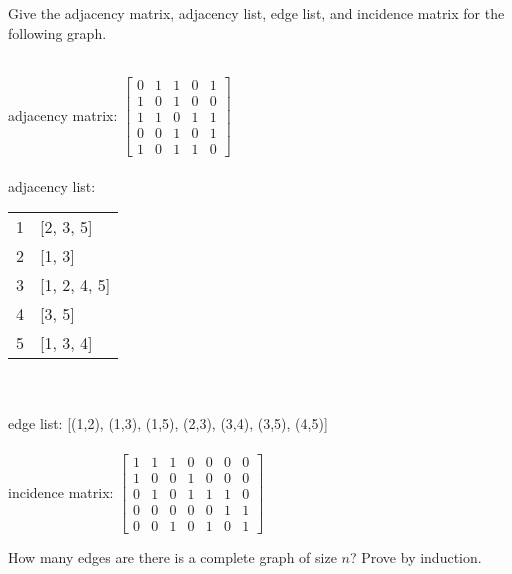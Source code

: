 \documentclass[solutionorbox,answers]{exam}
\begin{document}
\begin{questions}
\question 
Give the adjacency matrix, adjacency list, edge list, and incidence matrix for the following graph. \\
\begin{minipage}{0.3\linewidth}
\end{minipage}
\qquad
\begin{minipage}{0.6\linewidth}
\begin{solutionbox}{3.8in}\\
  adjacency matrix:
  $\begin{bmatrix}
  0 & 1 & 1 & 0 & 1 \\
  1 & 0 & 1 & 0 & 0 \\
  1 & 1 & 0 & 1 & 1 \\
  0 & 0 & 1 & 0 & 1 \\
  1 & 0 & 1 & 1 & 0
  \end{bmatrix}$\\
  \\
  adjacency list:
  \begin{tabular}{ c|l }  
    1&[2, 3, 5]\\
    2&[1, 3]\\
    3&[1, 2, 4, 5]\\
    4&[3, 5]\\
    5&[1, 3, 4]
  \end{tabular}\\
  \\
  edge list: [(1,2), (1,3), (1,5), (2,3), (3,4), (3,5), (4,5)]\\
  \\
  incidence matrix:
  $\begin{bmatrix}
    1 & 1 & 1 & 0 & 0 & 0 & 0 \\
    1 & 0 & 0 & 1 & 0 & 0 & 0 \\
    0 & 1 & 0 & 1 & 1 & 1 & 0 \\
    0 & 0 & 0 & 0 & 0 & 1 & 1 \\
    0 & 0 & 1 & 0 & 1 & 0 & 1 
    \end{bmatrix}$\\
\end{solutionbox}
\end{minipage}
\question
How many edges are there is a complete graph of size $n$? Prove by induction.


\end{questions}
\end{document}
